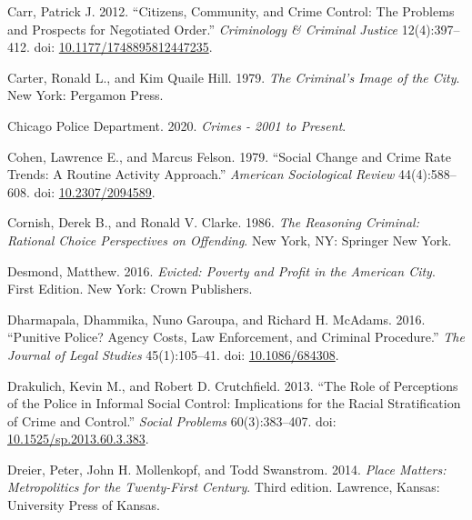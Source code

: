 \documentclass [11pt, proquest] {uwthesis}[2015/03/03]
\newlength{\cslhangindent}
\newenvironment{CSLReferences}[2]%
{\setlength{\parindent}{0pt}%
\everypar{\setlength{\hangindent}{\cslhangindent}}\ignorespaces}%
{\par}
\begin{document}
\begin{CSLReferences}{1}{0}
\leavevmode\hypertarget{ref-carrCitizensCommunityCrime2012}{}%
Carr, Patrick J. 2012. {``Citizens, {Community}, and {Crime Control}: {The Problems} and {Prospects} for {Negotiated Order}.''} \emph{Criminology \& Criminal Justice} 12(4):397--412. doi: \href{https://doi.org/10.1177/1748895812447235}{10.1177/1748895812447235}.

\leavevmode\hypertarget{ref-carterCriminalImageCity1979}{}%
Carter, Ronald L., and Kim Quaile Hill. 1979. \emph{The Criminal's Image of the City}. {New York}: {Pergamon Press}.

\leavevmode\hypertarget{ref-Crimes2001Present2020}{}%
{Chicago Police Department}. 2020. \emph{Crimes - 2001 to {Present}}.

\leavevmode\hypertarget{ref-cohenSocialChangeCrime1979}{}%
Cohen, Lawrence E., and Marcus Felson. 1979. {``Social {Change} and {Crime Rate Trends}: {A Routine Activity Approach}.''} \emph{American Sociological Review} 44(4):588--608. doi: \href{https://doi.org/10.2307/2094589}{10.2307/2094589}.

\leavevmode\hypertarget{ref-cornishReasoningCriminalRational1986}{}%
Cornish, Derek B., and Ronald V. Clarke. 1986. \emph{The {Reasoning Criminal}: {Rational Choice Perspectives} on {Offending}}. {New York, NY}: {Springer New York}.

\leavevmode\hypertarget{ref-desmondEvictedPovertyProfit2016}{}%
Desmond, Matthew. 2016. \emph{Evicted: Poverty and Profit in the {American} City}. First Edition. {New York}: {Crown Publishers}.

\leavevmode\hypertarget{ref-dharmapalaPunitivePoliceAgency2016}{}%
Dharmapala, Dhammika, Nuno Garoupa, and Richard H. McAdams. 2016. {``Punitive {Police}? {Agency Costs}, {Law Enforcement}, and {Criminal Procedure}.''} \emph{The Journal of Legal Studies} 45(1):105--41. doi: \href{https://doi.org/10.1086/684308}{10.1086/684308}.

\leavevmode\hypertarget{ref-drakulichRolePerceptionsPolice2013}{}%
Drakulich, Kevin M., and Robert D. Crutchfield. 2013. {``The {Role} of {Perceptions} of the {Police} in {Informal Social Control}: {Implications} for the {Racial Stratification} of {Crime} and {Control}.''} \emph{Social Problems} 60(3):383--407. doi: \href{https://doi.org/10.1525/sp.2013.60.3.383}{10.1525/sp.2013.60.3.383}.

\leavevmode\hypertarget{ref-dreierPlaceMattersMetropolitics2014}{}%
Dreier, Peter, John H. Mollenkopf, and Todd Swanstrom. 2014. \emph{Place {Matters}: {Metropolitics} for the {Twenty}-{First Century}}. Third edition. {Lawrence, Kansas}: {University Press of Kansas}.


\end{CSLReferences}
\end{document}
